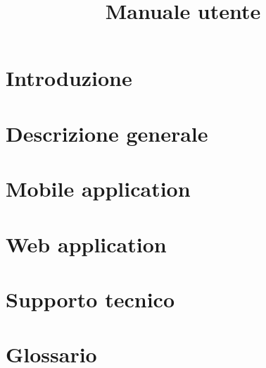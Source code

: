 \documentclass{article}
\title{Manuale utente}
\begin{document}


\section{Introduzione}%
\label{sec:introduzione}


\newpage
\section{Descrizione generale}%
\label{sec:descrizione_generale}


\newpage
\section{Mobile application}%
\label{sec:mobile_application}


\newpage
\section{Web application}%
\label{sec:web_application}


\newpage
\section{Supporto tecnico}%
\label{sec:supporto_tecnico}


\newpage
\appendix
\setcounter{secnumdepth}{1} %
\section{Glossario}%
\label{sec:glossario}

\end{document}
